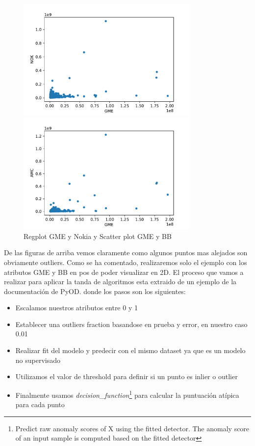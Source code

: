 \documentclass[12pt,twoside]{report}
\begin{document}
\begin{figure}[H]
\begin{multicols}{2}
    \includegraphics[width=9cm]{../code/figures/GME_NOK.pdf}\par 
    \includegraphics[width=9cm]{../code/figures/GME_AMC.pdf}\par 
\end{multicols}
\caption{Regplot GME y Nokia y Scatter plot GME y BB}
\label{fig:regplot-3}
\end{figure}

De las figuras de arriba vemos claramente como algunos puntos mas alejados son obviamente outliers. Como se ha comentado, realizaremos solo el ejemplo con los atributos GME y BB en pos de poder visualizar en 2D. El proceso que vamos a realizar para aplicar la tanda de algoritmos esta extraido de un ejemplo de la documentación de PyOD. \cite{pyod-comparison} donde los pasos son los siguientes:

\begin{itemize}
	\item Escalamos nuestros atributos entre 0 y 1
	\item Establecer una outliers fraction basandose en prueba y error, en nuestro caso 0.01
	\item Realizar fit del modelo y predecir con el mismo dataset ya que es un modelo no supervisado
	\item Utilizamos el valor de threshold para definir si un punto es inlier o outlier
	\item Finalmente usamos \textit{decision\_function}\footnote{Predict raw anomaly scores of X using the fitted detector.
The anomaly score of an input sample is computed based on the fitted detector} para calcular la puntuación atípica para cada punto
\end{itemize}
\end{document}
